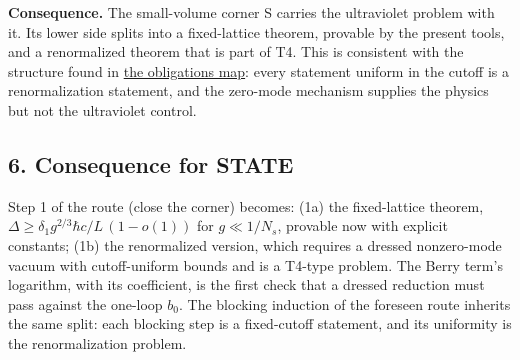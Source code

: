 \documentclass[11pt,a4paper]{article}
\begin{document}
\textbf{Consequence.} The small-volume corner S carries the ultraviolet
problem with it. Its lower side splits into a fixed-lattice theorem,
provable by the present tools, and a renormalized theorem that is part
of T4. This is consistent with the structure found in
\href{mass-gap-obligations-lattice.md}{the obligations map}: every
statement uniform in the cutoff is a renormalization statement, and the
zero-mode mechanism supplies the physics but not the ultraviolet
control.

\hypertarget{consequence-for-state}{%
\subsection{6. Consequence for STATE}\label{consequence-for-state}}

Step 1 of the route (close the corner) becomes: (1a) the fixed-lattice
theorem, \(\Delta\ge\delta_1g^{2/3}\hbar c/L\,(1-o(1))\) for
\(g\ll1/N_s\), provable now with explicit constants; (1b) the
renormalized version, which requires a dressed nonzero-mode vacuum with
cutoff-uniform bounds and is a T4-type problem. The Berry term's
logarithm, with its coefficient, is the first check that a dressed
reduction must pass against the one-loop \(b_0\). The blocking induction
of the foreseen route inherits the same split: each blocking step is a
fixed-cutoff statement, and its uniformity is the renormalization
problem.
\end{document}

